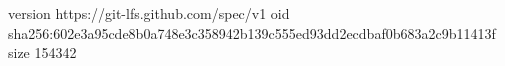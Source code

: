 version https://git-lfs.github.com/spec/v1
oid sha256:602e3a95cde8b0a748e3c358942b139c555ed93dd2ecdbaf0b683a2c9b11413f
size 154342
